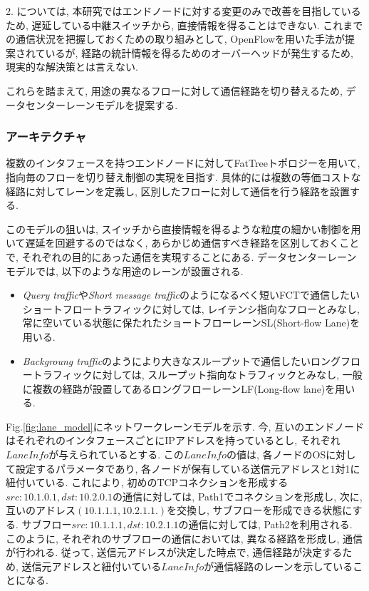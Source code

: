 2. については, 本研究ではエンドノードに対する変更のみで改善を目指しているため, 遅延している中継スイッチから, 直接情報を得ることはできない. 
これまでの通信状況を把握しておくための取り組みとして, OpenFlowを用いた手法が提案されているが,
経路の統計情報を得るためのオーバーヘッドが発生するため, 現実的な解決策とは言えない\cite{devoflow}.

これらを踏まえて, 用途の異なるフローに対して通信経路を切り替えるため, データセンターレーンモデルを提案する.

\subsubsection{アーキテクチャ}
複数のインタフェースを持つエンドノードに対してFatTreeトポロジーを用いて, 指向毎のフローを切り替え制御の実現を目指す.  
具体的には複数の等価コストな経路に対してレーンを定義し, 区別したフローに対して通信を行う経路を設置する. 

このモデルの狙いは, スイッチから直接情報を得るような粒度の細かい制御を用いて遅延を回避するのではなく,
あらかじめ通信すべき経路を区別しておくことで, それぞれの目的にあった通信を実現することにある. 
データセンターレーンモデルでは, 以下のような用途のレーンが設置される. 
\begin{itemize}
\item {\it Query traffic}や{\it Short message
traffic}のようになるべく短いFCTで通信したいショートフロートラフィックに対しては, レイテンシ指向なフローとみなし,
常に空いている状態に保たれたショートフローレーンSL(Short-flow Lane)を用いる.
\item {\it Backgroung traffic}のようにより大きなスループットで通信したいロングフロートラフィックに対しては,
スループット指向なトラフィックとみなし, 一般に複数の経路が設置してあるロングフローレーンLF(Long-flow lane)を用いる. 
\end{itemize}

Fig.\ref{fig:lane_model}にネットワークレーンモデルを示す. 
今, 互いのエンドノードはそれぞれのインタフェースごとにIPアドレスを持っているとし, それぞれ$Lane Info$が与えられているとする. 
この$Lane Info$の値は, 各ノードのOSに対して設定するパラメータであり, 各ノードが保有している送信元アドレスと1対1に紐付いている. 
これにより, 初めのTCPコネクションを形成する$src:10.1.0.1, dst:10.2.0.1$の通信に対しては, Path1でコネクションを形成し, 
次に, 互いのアドレス$(10.1.1.1, 10.2.1.1.)$を交換し, サブフローを形成できる状態にする. 
サブフロー$src:10.1.1.1, dst:10.2.1.1$の通信に対しては, Path2を利用される. 
このように, それぞれのサブフローの通信においては, 異なる経路を形成し, 通信が行われる. 
従って, 送信元アドレスが決定した時点で, 通信経路が決定するため, 送信元アドレスと紐付いている$Lane
Info$が通信経路のレーンを示していることになる.

